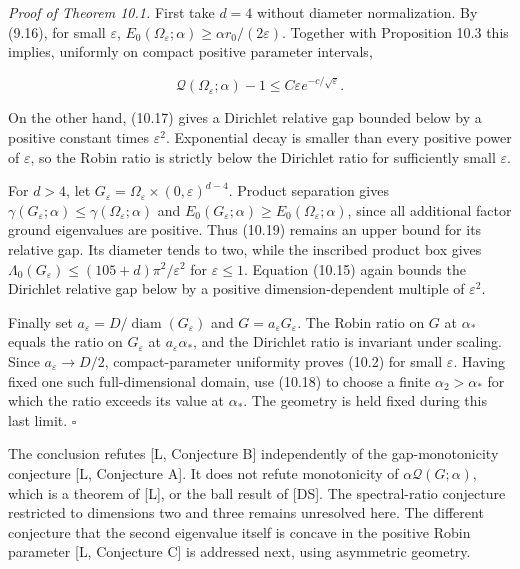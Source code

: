 \documentclass[11pt]{article}
\begin{document}
\emph{Proof of Theorem 10.1.} First take \(d=4\) without diameter
normalization. By (9.16), for small \(\varepsilon\),
\(E_0(\Omega_\varepsilon;\alpha)\ge\alpha r_0/(2\varepsilon)\). Together
with Proposition 10.3 this implies, uniformly on compact positive
parameter intervals,

\[
\mathcal Q(\Omega_\varepsilon;\alpha)-1
\le C\varepsilon e^{-c/\sqrt\varepsilon}.
\tag{10.19}
\]

On the other hand, (10.17) gives a Dirichlet relative gap bounded below
by a positive constant times \(\varepsilon^2\). Exponential decay is
smaller than every positive power of \(\varepsilon\), so the Robin ratio
is strictly below the Dirichlet ratio for sufficiently small
\(\varepsilon\).

For \(d>4\), let
\(G_\varepsilon=\Omega_\varepsilon\times(0,\varepsilon)^{d-4}\). Product
separation gives
\(\gamma(G_\varepsilon;\alpha)\le\gamma(\Omega_\varepsilon;\alpha)\) and
\(E_0(G_\varepsilon;\alpha)\ge E_0(\Omega_\varepsilon;\alpha)\), since
all additional factor ground eigenvalues are positive. Thus (10.19)
remains an upper bound for its relative gap. Its diameter tends to two,
while the inscribed product box gives
\(\Lambda_0(G_\varepsilon)\le(105+d)\pi^2/\varepsilon^2\) for
\(\varepsilon\le1\). Equation (10.15) again bounds the Dirichlet
relative gap below by a positive dimension-dependent multiple of
\(\varepsilon^2\).

Finally set \(a_\varepsilon=D/\operatorname{diam}(G_\varepsilon)\) and
\(G=a_\varepsilon G_\varepsilon\). The Robin ratio on \(G\) at
\(\alpha_*\) equals the ratio on \(G_\varepsilon\) at
\(a_\varepsilon\alpha_*\), and the Dirichlet ratio is invariant under
scaling. Since \(a_\varepsilon\to D/2\), compact-parameter uniformity
proves (10.2) for small \(\varepsilon\). Having fixed one such
full-dimensional domain, use (10.18) to choose a finite
\(\alpha_2>\alpha_*\) for which the ratio exceeds its value at
\(\alpha_*\). The geometry is held fixed during this last limit. \(\square\)

The conclusion refutes {[}L, Conjecture B{]} independently of the
gap-monotonicity conjecture {[}L, Conjecture A{]}. It does not refute
monotonicity of \(\alpha\mathcal Q(G;\alpha)\), which is a theorem of
{[}L{]}, or the ball result of {[}DS{]}. The spectral-ratio conjecture
restricted to dimensions two and three remains unresolved here. The
different conjecture that the second eigenvalue itself is concave in the
positive Robin parameter {[}L, Conjecture C{]} is addressed next, using
asymmetric geometry.
\end{document}
